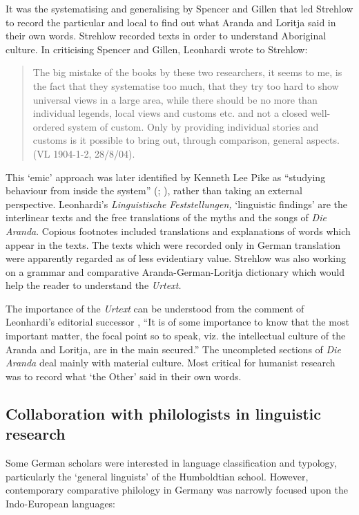 \documentclass[output=paper]{langsci/langscibook}
\begin{document}
It was the systematising and generalising by Spencer and Gillen that led Strehlow to record the particular and local to find out what Aranda and Loritja said in their own words. Strehlow recorded texts in order to understand Aboriginal culture. In criticising Spencer and Gillen, Leonhardi wrote to Strehlow:

\begin{quote}
    The big mistake of the books by these two researchers, it seems to me, is the fact that they systematise too much, that they try too hard to show universal views in a large area, while there should be no more than individual legends, local views and customs etc. and not a closed well-ordered system of custom. Only by providing individual stories and customs is it possible to bring out, through comparison, general aspects. (VL 1904-1-2, 28/8/04).
\end{quote}

This ‘emic’ approach was later identified by Kenneth Lee Pike as “studying behaviour from inside the system” (\citealt[37]{pike_language_1967}; \citealt[542]{bolinger_aspects_1975}), rather than taking an external perspective. Leonhardi’s \textit{Linguistische} \textit{Feststellungen,} ‘linguistic findings’ are the interlinear texts and the free translations of the myths and the songs of \textit{Die} \textit{Aranda}. Copious footnotes included translations and explanations of words which appear in the texts. The texts which were recorded only in German translation were apparently regarded as of less evidentiary value. Strehlow was also working on a grammar and comparative Aranda-German-Loritja dictionary which would help the reader to understand the \textit{Urtext.} 

The importance of the \textit{Urtext} can be understood from the comment of Leonhardi’s editorial successor \citet[285]{hagen_preface_1991}, “It is of some importance to know that the most important matter, the focal point so to speak, viz. the intellectual culture of the Aranda and Loritja, are in the main secured.” The uncompleted sections of \textit{Die} \textit{Aranda} deal mainly with material culture. Most critical for humanist research was to record what ‘the Other’ said in their own words.

\subsection{Collaboration with philologists in linguistic research} 

Some German scholars were interested in language classification and typology, particularly the ‘general linguists’ of the Humboldtian school. However, contemporary comparative philology in Germany was narrowly focused upon the Indo-European languages:
\end{document}
